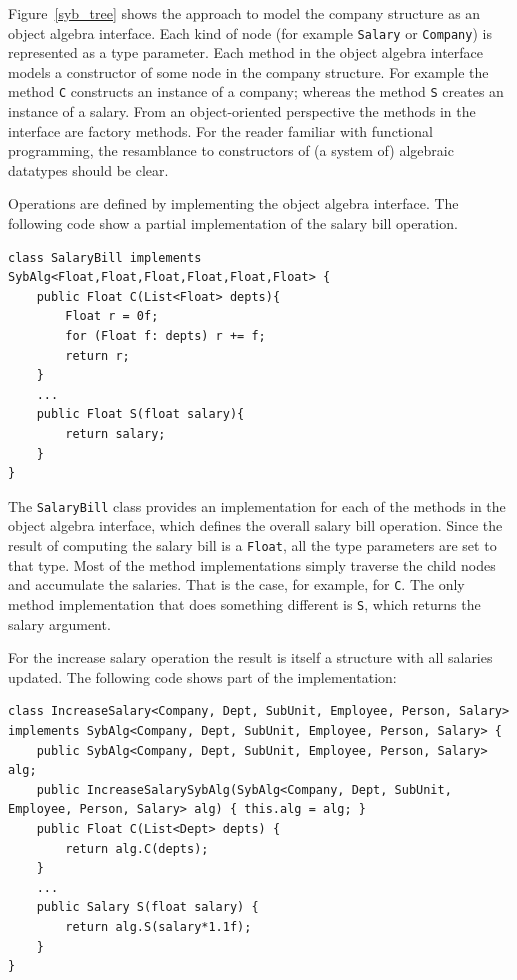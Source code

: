 Figure~\ref{syb_tree} shows the approach to model the company
structure as an object algebra interface. Each kind of node (for
example \lstinline{Salary} or \lstinline{Company}) is represented as a
type parameter. Each method in the object algebra interface models a
constructor of some node in the company structure. For example the
method \lstinline{C} constructs an instance of a company; whereas the
method \lstinline{S} creates an instance of a salary. From an
object-oriented perspective the methods in the interface are factory
methods. For the reader familiar with functional programming, the
resamblance to constructors of  (a system of) algebraic datatypes should be clear.

Operations are defined by implementing the object algebra interface.
The following code show a partial implementation of the salary bill
operation.

\begin{lstlisting}[numbers=none]
class SalaryBill implements SybAlg<Float,Float,Float,Float,Float,Float> {
	public Float C(List<Float> depts){
		Float r = 0f;
		for (Float f: depts) r += f;
		return r;
	}
	...
	public Float S(float salary){
		return salary;
	}
}
\end{lstlisting}

The \lstinline{SalaryBill} class provides an implementation for each
of the methods in the object algebra interface, which defines the
overall salary bill operation. Since the result of computing the
salary bill is a \lstinline{Float}, all the type parameters are set to
that type. Most of the method implementations simply traverse the
child nodes and accumulate the salaries. That is the case, for
example, for \lstinline{C}. The only method implementation that does
something different is \lstinline{S}, which returns the salary
argument.

For the increase salary operation the result is itself a structure
with all salaries updated. The following code shows part of the
implementation:

\begin{lstlisting}[numbers=none]
class IncreaseSalary<Company, Dept, SubUnit, Employee, Person, Salary> implements SybAlg<Company, Dept, SubUnit, Employee, Person, Salary> {
	public SybAlg<Company, Dept, SubUnit, Employee, Person, Salary> alg;
	public IncreaseSalarySybAlg(SybAlg<Company, Dept, SubUnit, Employee, Person, Salary> alg) { this.alg = alg; }
	public Float C(List<Dept> depts) {
		return alg.C(depts);
	}
	...
	public Salary S(float salary) {
		return alg.S(salary*1.1f);
	}
}
\end{lstlisting}

